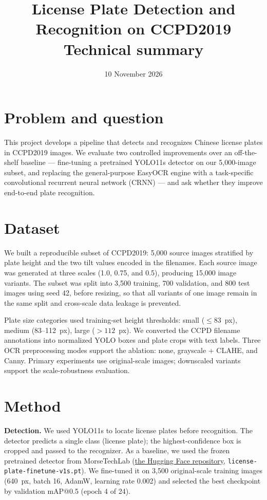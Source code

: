 \documentclass[10pt]{article}
\title{License Plate Detection and Recognition on CCPD2019\\ \large Technical summary}
\date{10 November 2026}
\begin{document}
\maketitle
\vspace*{-1.4cm}

\section{Problem and question}

This project develops a pipeline that detects and recognizes Chinese
license plates in CCPD2019 images. We evaluate two controlled
improvements over an off-the-shelf baseline --- fine-tuning a
pretrained YOLO11s detector on our 5{,}000-image subset, and replacing
the general-purpose EasyOCR engine with a task-specific convolutional
recurrent neural network (CRNN) --- and ask whether they improve
end-to-end plate recognition.

\section{Dataset}

We built a reproducible subset of CCPD2019: 5{,}000 source images
stratified by plate height and the two tilt values encoded in the
filenames. Each source image was generated at
three scales (1.0, 0.75, and 0.5), producing 15{,}000 image variants.
The subset was split into 3{,}500 training, 700 validation, and 800 test
images using seed 42, before resizing, so that all variants of one image
remain in the same split and cross-scale data leakage is prevented.

Plate size categories used training-set height thresholds: small
($\le 83$~px), medium (83--112~px), large ($> 112$~px). We converted the
CCPD filename annotations into normalized YOLO boxes and plate crops
with text labels. Three OCR preprocessing modes support the ablation:
none, grayscale + CLAHE, and Canny. Primary experiments use
original-scale images; downscaled variants support the scale-robustness
evaluation.

\section{Method}

\textbf{Detection.} We used YOLO11s to locate license plates before
recognition. The detector predicts a single class (license plate); the
highest-confidence box is cropped and passed to the recognizer. As a
baseline, we used the frozen
pretrained detector from MorseTechLab
(\href{https://huggingface.co/morsetechlab/yolov11-license-plate-detection}{the Hugging Face repository},
\texttt{license-plate-finetune-v1s.pt}). We fine-tuned it on 3{,}500
original-scale training images (640~px, batch 16, AdamW, learning rate
0.002) and selected the best checkpoint by validation mAP@0.5 (epoch 4
of 24).
\end{document}
